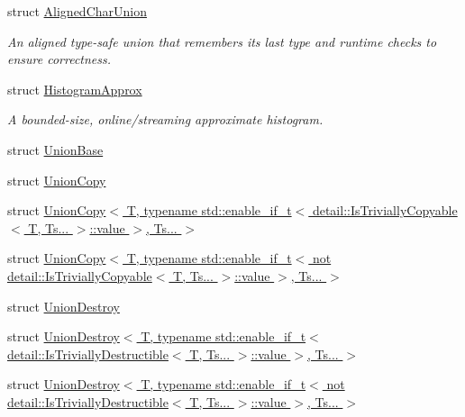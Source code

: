 \begin{DoxyCompactItemize}
\item 
struct \hyperlink{structvt_1_1util_1_1adt_1_1_aligned_char_union}{Aligned\+Char\+Union}
\begin{DoxyCompactList}\small\item\em An aligned type-\/safe union that remembers its last type and runtime checks to ensure correctness. \end{DoxyCompactList}\item 
struct \hyperlink{structvt_1_1util_1_1adt_1_1_histogram_approx}{Histogram\+Approx}
\begin{DoxyCompactList}\small\item\em A bounded-\/size, online/streaming approximate histogram. \end{DoxyCompactList}\item 
struct \hyperlink{structvt_1_1util_1_1adt_1_1_union_base}{Union\+Base}
\item 
struct \hyperlink{structvt_1_1util_1_1adt_1_1_union_copy}{Union\+Copy}
\item 
struct \hyperlink{structvt_1_1util_1_1adt_1_1_union_copy_3_01_t_00_01typename_01std_1_1enable__if__t_3_01detail_1_39951ca88dc847bbf698c46d828c8188}{Union\+Copy$<$ T, typename std\+::enable\+\_\+if\+\_\+t$<$ detail\+::\+Is\+Trivially\+Copyable$<$ T, Ts... $>$\+::value $>$, Ts... $>$}
\item 
struct \hyperlink{structvt_1_1util_1_1adt_1_1_union_copy_3_01_t_00_01typename_01std_1_1enable__if__t_3_01not_01det4a1e3b5522a7a77cb5d4fb8991a6197b}{Union\+Copy$<$ T, typename std\+::enable\+\_\+if\+\_\+t$<$ not detail\+::\+Is\+Trivially\+Copyable$<$ T, Ts... $>$\+::value $>$, Ts... $>$}
\item 
struct \hyperlink{structvt_1_1util_1_1adt_1_1_union_destroy}{Union\+Destroy}
\item 
struct \hyperlink{structvt_1_1util_1_1adt_1_1_union_destroy_3_01_t_00_01typename_01std_1_1enable__if__t_3_01detail42179a636679a7a81522739bdddb7210}{Union\+Destroy$<$ T, typename std\+::enable\+\_\+if\+\_\+t$<$ detail\+::\+Is\+Trivially\+Destructible$<$ T, Ts... $>$\+::value $>$, Ts... $>$}
\item 
struct \hyperlink{structvt_1_1util_1_1adt_1_1_union_destroy_3_01_t_00_01typename_01std_1_1enable__if__t_3_01not_0117947c5b8b44b7d9f4a4df27d8795277}{Union\+Destroy$<$ T, typename std\+::enable\+\_\+if\+\_\+t$<$ not detail\+::\+Is\+Trivially\+Destructible$<$ T, Ts... $>$\+::value $>$, Ts... $>$}
\end{DoxyCompactItemize}
